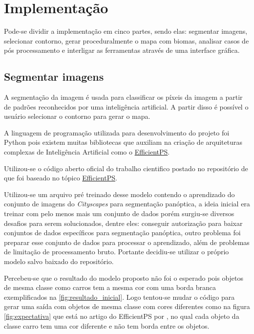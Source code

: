 \section{Implementação}

Pode-se dividir a implementação em cinco partes, sendo elas: segmentar imagens, selecionar contorno, gerar proceduralmente o mapa com biomas, analisar casos de pós processamento e interligar as ferramentas através de uma interface gráfica.

\subsection{Segmentar imagens}

A segmentação da imagem é usada para classificar os píxeis da imagem a partir de padrões reconhecidos por uma inteligência artificial. A partir disso é possível o usuário selecionar o contorno para gerar o mapa.

A linguagem de programação utilizada para desenvolvimento do projeto foi Python pois existem muitas bibliotecas que auxiliam na criação de arquiteturas complexas de Inteligência Artificial como o \hyperref[sec:EfficientPS]{EfficientPS}.

Utilizou-se o código aberto oficial do trabalho cientifico postado no repositório de  que foi baseado no tópico \hyperref[sec:EfficientPS]{EfficientPS}.

Utilizou-se um arquivo pré treinado desse modelo contendo o aprendizado do conjunto de imagens do \textit{Cityscapes} para segmentação panóptica, a ideia inicial era treinar com pelo menos mais um conjunto de dados porém surgiu-se diversos desafios para serem solucionados, dentre eles: conseguir autorização para baixar conjuntos de dados específicos para segmentação panóptica, outro problema foi preparar esse conjunto de dados para processar o aprendizado, além de problemas de limitação de processamento bruto. Portante decidiu-se utilizar o próprio modelo salvo baixado do repositório.

Percebeu-se que o resultado do modelo proposto não foi o esperado pois objetos de mesma classe como carros tem a mesma cor com uma borda branca exemplificados na \cref{fig:resultado_inicial}. Logo tentou-se mudar o código para gerar uma saída com objetos de mesma classe com cores diferentes como na figura \cref{fig:expectativa} que está no artigo do EfficientPS por , no qual cada objeto da classe carro tem uma cor diferente e não tem borda entre os objetos.

